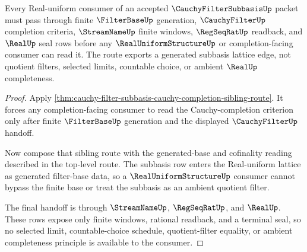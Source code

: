\begin{theorem}
\label{thm:cauchy-filter-subbasis-orphan-route}
Every Real-uniform consumer of an accepted $\CauchyFilterSubbasisUp$ packet must pass through finite $\FilterBaseUp$ generation, $\CauchyFilterUp$ completion criteria, $\StreamNameUp$ finite windows, $\RegSeqRatUp$ readback, and $\RealUp$ seal rows before any $\RealUniformStructureUp$ or completion-facing consumer can read it. The route exports a generated subbasis lattice edge, not quotient filters, selected limits, countable choice, or ambient $\RealUp$ completeness.
\end{theorem}
\begin{proof}
Apply \autoref{thm:cauchy-filter-subbasis-cauchy-completion-sibling-route}. It forces any completion-facing consumer to read the Cauchy-completion criterion only after finite $\FilterBaseUp$ generation and the displayed $\CauchyFilterUp$ handoff.

Now compose that sibling route with the generated-base and cofinality reading described in the top-level route. The subbasis row enters the Real-uniform lattice as generated filter-base data, so a $\RealUniformStructureUp$ consumer cannot bypass the finite base or treat the subbasis as an ambient quotient filter.

The final handoff is through $\StreamNameUp$, $\RegSeqRatUp$, and $\RealUp$. These rows expose only finite windows, rational readback, and a terminal seal, so no selected limit, countable-choice schedule, quotient-filter equality, or ambient completeness principle is available to the consumer.
\end{proof}
